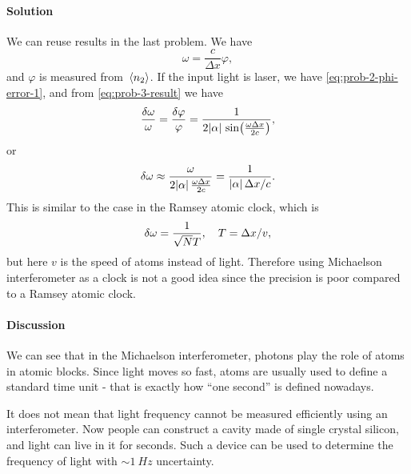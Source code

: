 \documentclass[hyperref, a4paper]{article}
\begin{document}
\paragraph{Solution} We can reuse results in the last problem. We have 
\begin{equation}
    \omega = \frac{c}{\Delta x} \varphi,
    \label{eq:prob-3-result}
\end{equation}
and $\varphi$ is measured from $\expval*{n_2}$. If the input light is laser, we have \eqref{eq:prob-2-phi-error-1},
and from \eqref{eq:prob-3-result} we have 
\begin{equation}
    \frac{\var{\omega}}{\omega} = \frac{\var{\varphi}}{\varphi} = \frac{1}{2 \abs*{\alpha} \sin(\frac{\omega \Delta x}{2 c})},
\end{equation}
or 
\begin{equation}
    \var{\omega} \approx \frac{\omega}{2 \abs*{\alpha} \frac{\omega \Delta x}{2 c}} = \frac{1}{\abs*{\alpha} \Delta x / c}.
\end{equation}
This is similar to the case in the Ramsey atomic clock, which is 
\begin{equation}
    \var{\omega} = \frac{1}{\sqrt{N} T}, \quad T = \Delta x / v,
\end{equation}
but here $v$ is the speed of atoms instead of light. Therefore using Michaelson interferometer as a clock is not a good idea since the precision is poor compared to a Ramsey atomic clock.

\paragraph{Discussion} We can see that in the Michaelson interferometer, photons play the role of atoms in atomic blocks.
Since light moves so fast, atoms are usually used to define a standard time unit - that is exactly how ``one second'' is 
defined nowadays.

It does not mean that light frequency cannot be measured efficiently using an interferometer.
Now people can construct a cavity made of single crystal silicon, and light can live in it for seconds. 
Such a device can be used to determine the frequency of light with $\sim \SI{1}{Hz}$ uncertainty.
\end{document}
